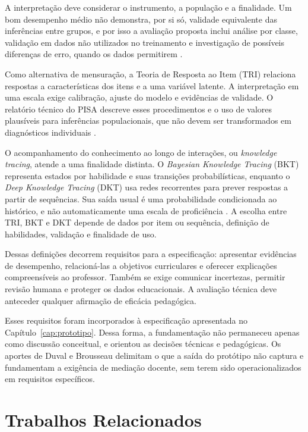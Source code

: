 A interpretação deve considerar o instrumento, a população e a finalidade. Um bom desempenho médio não demonstra, por si só, validade equivalente das inferências entre grupos, e por isso a avaliação proposta inclui análise por classe, validação em dados não utilizados no treinamento e investigação de possíveis diferenças de erro, quando os dados permitirem \cite{NRC2001}.

Como alternativa de mensuração, a Teoria de Resposta ao Item (TRI) relaciona respostas a características dos itens e a uma variável latente. A interpretação em uma escala exige calibração, ajuste do modelo e evidências de validade. O relatório técnico do PISA descreve esses procedimentos e o uso de valores plausíveis para inferências populacionais, que não devem ser transformados em diagnósticos individuais \cite{OECDTechnical2024}.

O acompanhamento do conhecimento ao longo de interações, ou \textit{knowledge tracing}, atende a uma finalidade distinta. O \textit{Bayesian Knowledge Tracing} (BKT) representa estados por habilidade e suas transições probabilísticas, enquanto o \textit{Deep Knowledge Tracing} (DKT) usa redes recorrentes para prever respostas a partir de sequências. Sua saída usual é uma probabilidade condicionada ao histórico, e não automaticamente uma escala de proficiência \cite{Abdelrahman2023}. A escolha entre TRI, BKT e DKT depende de dados por item ou sequência, definição de habilidades, validação e finalidade de uso.

Dessas definições decorrem requisitos para a especificação: apresentar evidências de desempenho, relacioná-las a objetivos curriculares e oferecer explicações compreensíveis ao professor. Também se exige comunicar incertezas, permitir revisão humana e proteger os dados educacionais. A avaliação técnica deve anteceder qualquer afirmação de eficácia pedagógica.

Esses requisitos foram incorporados à especificação apresentada no Capítulo~\ref{cap:prototipo}. Dessa forma, a fundamentação não permaneceu apenas como discussão conceitual, e orientou as decisões técnicas e pedagógicas. Os aportes de Duval e Brousseau delimitam o que a saída do protótipo não captura e fundamentam a exigência de mediação docente, sem terem sido operacionalizados em requisitos específicos.

\section{Trabalhos Relacionados}
\label{sec:trabalhos-relacionados}

